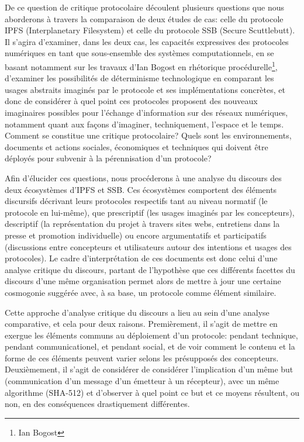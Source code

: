 \documentclass{article}
\begin{document}
De ce question de critique protocolaire découlent plusieurs questions que nous aborderons à travers la comparaison de deux études de cas: celle du protocole IPFS (Interplanetary Filesystem) et celle du protocole SSB (Secure Scuttlebutt). Il s'agira d'examiner, dans les deux cas, les capacités expressives des protocoles numériques en tant que sous-ensemble des systèmes computationnels, en se basant notamment sur les travaux d'Ian Bogost en rhétorique procédurelle\footnote{Ian Bogost}, d'examiner les possibilités de déterminisme technologique en comparant les usages abstraits imaginés par le protocole et ses implémentations concrètes, et donc de considérer à quel point ces protocoles proposent des nouveaux imaginaires possibles pour l'échange d'information sur des réseaux numériques, notamment quant aux façons d'imaginer, techniquement, l'espace et le temps. Comment se constitue une critique protocolaire? Quels sont les environnements, documents et actions sociales, économiques et techniques qui doivent être déployés pour subvenir à la pérennisation d'un protocole?

Afin d'élucider ces questions, nous procéderons à une analyse du discours des deux écosystèmes d'IPFS et SSB. Ces écosystèmes comportent des éléments discursifs décrivant leurs protocoles respectifs tant au niveau normatif (le protocole en lui-même), que prescriptif (les usages imaginés par les concepteurs), descriptif (la représentation du projet à travers sites webs, entretiens dans la presse et promotion individuelle) ou encore argumentatifs et participatifs (discussions entre concepteurs et utilisateurs autour des intentions et usages des protocoles). Le cadre d'interprétation de ces documents est donc celui d'une analyse critique du discours, partant de l'hypothèse que ces différents facettes du discours d'une même organisation permet alors de mettre à jour une certaine cosmogonie suggérée avec, à sa base, un protocole comme élément similaire.

Cette approche d'analyse critique du discours a lieu au sein d'une analyse comparative, et cela pour deux raisons. Premièrement, il s'agit de mettre en exergue les éléments communs au déploiement d'un protocole: pendant technique, pendant communicationel, et pendant social, et de voir comment le contenu et la forme de ces éléments peuvent varier selons les présupposés des concepteurs. Deuxièmement, il s'agit de considérer de considérer l'implication d'un même but (communication d'un message d'un émetteur à un récepteur), avec un même algorithme (SHA-512) et d'observer à quel point ce but et ce moyens résultent, ou non, en des conséquences drastiquement différentes.
\end{document}
